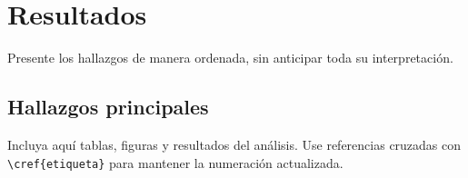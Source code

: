 \chapter{Resultados}
\label{cap:resultados}

Presente los hallazgos de manera ordenada, sin anticipar toda su interpretación.

\section{Hallazgos principales}

Incluya aquí tablas, figuras y resultados del análisis. Use referencias
cruzadas con \verb|\cref{etiqueta}| para mantener la numeración actualizada.
